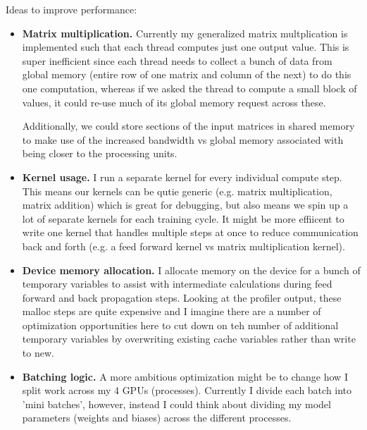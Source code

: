\documentclass[12pt,letterpaper,twoside]{article}
\begin{document}
Ideas to improve performance:
\begin{itemize}
    \item \textbf{Matrix multiplication.} Currently my generalized matrix multplication 
    is implemented such that each thread computes just one output value. This is super 
    inefficient since each thread needs to collect a bunch of data from global memory 
    (entire row of one matrix and column of the next) to do this one computation, 
    whereas if we asked the thread to compute a small block of values, it could 
    re-use much of its global memory request across these. 

    Additionally, we could store sections of the input matrices in shared memory to 
    make use of the increased bandwidth vs global memory associated with being 
    closer to the processing units.

    \item \textbf{Kernel usage.} I run a separate kernel for every individual compute 
    step. This means our kernels can be qutie generic (e.g. matrix multiplication, 
    matrix addition) which is great for debugging, but also means we spin up a lot 
    of separate kernels for each training cycle. It might be more effiicent to write 
    one kernel that handles multiple steps at once to reduce communication back and 
    forth (e.g. a feed forward kernel vs matrix multiplication kernel). 
    
    \item \textbf{Device memory allocation.} I allocate memory on the device for a 
    bunch of temporary variables to assist with intermediate calculations during 
    feed forward and back propagation steps. Looking at the profiler output, these 
    malloc steps are quite expensive and I imagine there are a number of optimization
    opportunities here to cut down on teh number of additional temporary variables
    by overwriting existing cache variables rather than write to new. 

    \item \textbf{Batching logic.} A more ambitious optimization might be to change 
    how I split work across my 4 GPUs (processes). Currently I divide each batch 
    into 'mini batches', however, instead I could think about dividing my model 
    parameters (weights and biases) across the different processes. 

\end{itemize}
\end{document}
